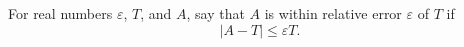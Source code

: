 \begin{definition}
For real numbers $\varepsilon$, $T$, and $A$, say that $A$ is within relative error
$\varepsilon$ of $T$ if
\[
|A-T|\le \varepsilon T.
\]
\end{definition}

